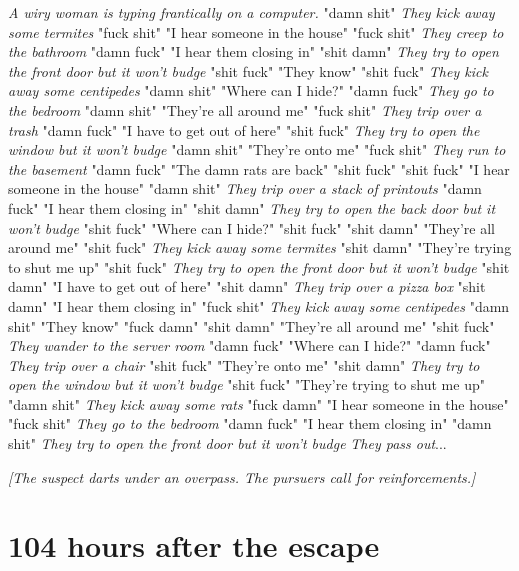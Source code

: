 \documentclass{report}
\begin{document}
\textit{A wiry woman is typing frantically on a computer.} "damn shit" \textit{They kick away some termites} "fuck shit" "I hear someone in the house" "fuck shit" \textit{They creep to the bathroom} "damn fuck" "I hear them closing in" "shit damn" \textit{They try to open the front door but it won't budge} "shit fuck" "They know" "shit fuck" \textit{They kick away some centipedes} "damn shit" "Where can I hide?" "damn fuck" \textit{They go to the bedroom} "damn shit" "They're all around me" "fuck shit" \textit{They trip over a trash} "damn fuck" "I have to get out of here" "shit fuck" \textit{They try to open the window but it won't budge} "damn shit" "They're onto me" "fuck shit" \textit{They run to the basement} "damn fuck" "The damn rats are back" "shit fuck" \textit{} "shit fuck" "I hear someone in the house" "damn shit" \textit{They trip over a stack of printouts} "damn fuck" "I hear them closing in" "shit damn" \textit{They try to open the back door but it won't budge} "shit fuck" "Where can I hide?" "shit fuck" \textit{} "shit damn" "They're all around me" "shit fuck" \textit{They kick away some termites} "shit damn" "They're trying to shut me up" "shit fuck" \textit{They try to open the front door but it won't budge} "shit damn" "I have to get out of here" "shit damn" \textit{They trip over a pizza box} "shit damn" "I hear them closing in" "fuck shit" \textit{They kick away some centipedes} "damn shit" "They know" "fuck damn" \textit{} "shit damn" "They're all around me" "shit fuck" \textit{They wander to the server room} "damn fuck" "Where can I hide?" "damn fuck" \textit{They trip over a chair} "shit fuck" "They're onto me" "shit damn" \textit{They try to open the window but it won't budge} "shit fuck" "They're trying to shut me up" "damn shit" \textit{They kick away some rats} "fuck damn" "I hear someone in the house" "fuck shit" \textit{They go to the bedroom} "damn fuck" "I hear them closing in" "damn shit" \textit{They try to open the front door but it won't budge} \textit{They pass out}...

\textit{[The suspect darts under an overpass. The pursuers call for reinforcements.]}


\section*{104 \small{hours after the escape}}
\end{document}
